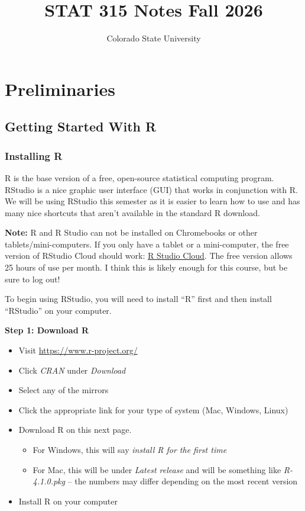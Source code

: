 \documentclass[
  11pt,
  oneside]{book}
\title{STAT 315 Notes Fall 2026}
\author{Colorado State University}
\date{}
\providecommand{\tightlist}{%
  \setlength{\itemsep}{0pt}\setlength{\parskip}{0pt}}
\theoremstyle{definition}
\theoremstyle{definition}
\theoremstyle{definition}
\theoremstyle{definition}
\theoremstyle{remark}
\begin{document}
\maketitle

{
\setcounter{tocdepth}{1}
\tableofcontents
}
\chapter*{Preliminaries}\label{preliminaries}

\section*{Getting Started With R}\label{getting-started-with-r}

\subsection*{Installing R}\label{installing-r}

R is the base version of a free, open-source statistical computing program. RStudio is a nice graphic user interface (GUI) that works in conjunction with R. We will be using RStudio this semester as it is easier to learn how to use and has many nice shortcuts that aren't available in the standard R download.

\textbf{Note:} R and R Studio can not be installed on Chromebooks or other tablets/mini-computers. If you only have a tablet or a mini-computer, the free version of RStudio Cloud should work: \href{https://posit.cloud/plans/free}{R Studio Cloud}. The free version allows 25 hours of use per month. I think this is likely enough for this course, but be sure to log out!

To begin using RStudio, you will need to install ``R'' first and then install ``RStudio'' on your computer.

\textbf{Step 1: Download R}

\begin{itemize}
\tightlist
\item
  Visit \url{https://www.r-project.org/}
\item
  Click \emph{CRAN} under \emph{Download}
\item
  Select any of the mirrors
\item
  Click the appropriate link for your type of system (Mac, Windows, Linux)
\item
  Download R on this next page.

  \begin{itemize}
  \tightlist
  \item
    For Windows, this will say \emph{install R for the first time}
  \item
    For Mac, this will be under \emph{Latest release} and will be something like \emph{R-4.1.0.pkg} -- the numbers may differ depending on the most recent version
  \end{itemize}
\item
  Install R on your computer
\end{itemize}
\end{document}
